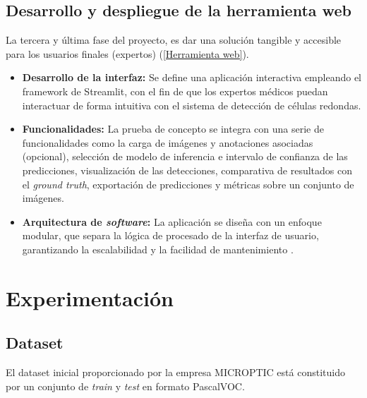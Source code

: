 \documentclass[12pt,a4paper,onecolumn,oneside]{report}
\begin{document}
\section{Desarrollo y despliegue de la herramienta web}
\label{Despliegue de la herramienta web}

La tercera y última fase del proyecto, es dar una solución tangible y accesible para los usuarios finales (expertos) (\autoref{Herramienta web}).

\begin{itemize}
  \item \textbf{Desarrollo de la interfaz:} Se define una aplicación interactiva empleando el framework de Streamlit, con el fin de que los expertos médicos puedan interactuar de forma intuitiva con el sistema de detección de células redondas.
  \item \textbf{Funcionalidades:} La prueba de concepto se integra con una serie de funcionalidades como la carga de imágenes y anotaciones asociadas (opcional), selección de modelo de inferencia e intervalo de confianza de las predicciones, 
  visualización de las detecciones, comparativa de resultados con el \textit{ground truth}, exportación de predicciones y métricas sobre un conjunto de imágenes. 
  \item \textbf{Arquitectura de \textit{software}:} La aplicación se diseña con un enfoque modular, que separa la lógica de procesado de la interfaz de usuario, garantizando la escalabilidad y la facilidad de mantenimiento \cite{repoTFM}.
\end{itemize}

\chapter{Experimentación} %
\label{Experimentación}

\section{Dataset}
\label{sec:Dataset}
El dataset inicial proporcionado por la empresa MICROPTIC \cite{microptic} está constituido por un conjunto de \textit{train} y \textit{test} en formato PascalVOC.
\end{document}
